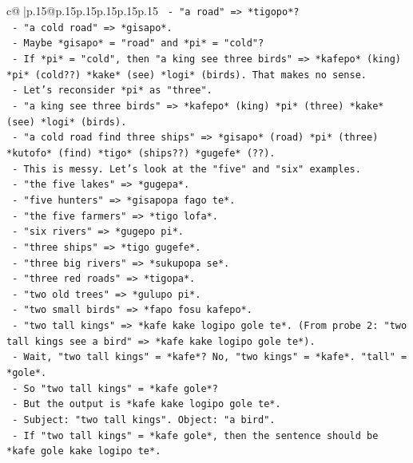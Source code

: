 \documentclass{article}
\begin{document}
{\begin{supertabular}{c@{$\;$}|p{.15\linewidth}@{}p{.15\linewidth}p{.15\linewidth}p{.15\linewidth}p{.15\linewidth}p{.15\linewidth}}
{{{\texttt{        {-} "a road" => *tigopo*?} \\
\texttt{        {-} "a cold road" => *gisapo*.} \\
\texttt{        {-} Maybe *gisapo* = "road" and *pi* = "cold"?} \\
\texttt{        {-} If *pi* = "cold", then "a king see three birds" => *kafepo* (king) *pi* (cold??) *kake* (see) *logi* (birds). That makes no sense.} \\
\texttt{        {-} Let's reconsider *pi* as "three".} \\
\texttt{        {-} "a king see three birds" => *kafepo* (king) *pi* (three) *kake* (see) *logi* (birds).} \\
\texttt{        {-} "a cold road find three ships" => *gisapo* (road) *pi* (three) *kutofo* (find) *tigo* (ships??) *gugefe* (??).} \\
\texttt{        {-} This is messy. Let's look at the "five" and "six" examples.} \\
\texttt{        {-} "the five lakes" => *gugepa*.} \\
\texttt{        {-} "five hunters" => *gisapopa fago te*.} \\
\texttt{        {-} "the five farmers" => *tigo lofa*.} \\
\texttt{        {-} "six rivers" => *gugepo pi*.} \\
\texttt{        {-} "three ships" => *tigo gugefe*.} \\
\texttt{        {-} "three big rivers" => *sukupopa se*.} \\
\texttt{        {-} "three red roads" => *tigopa*.} \\
\texttt{        {-} "two old trees" => *gulupo pi*.} \\
\texttt{        {-} "two small birds" => *fapo fosu kafepo*.} \\
\texttt{        {-} "two tall kings" => *kafe kake logipo gole te*. (From probe 2: "two tall kings see a bird" => *kafe kake logipo gole te*).} \\
\texttt{          {-} Wait, "two tall kings" = *kafe*? No, "two kings" = *kafe*. "tall" = *gole*.} \\
\texttt{          {-} So "two tall kings" = *kafe gole*?} \\
\texttt{          {-} But the output is *kafe kake logipo gole te*.} \\
\texttt{          {-} Subject: "two tall kings". Object: "a bird".} \\
\texttt{          {-} If "two tall kings" = *kafe gole*, then the sentence should be *kafe gole kake logipo te*.} \\
}}}
\end{supertabular}}
\end{document}
